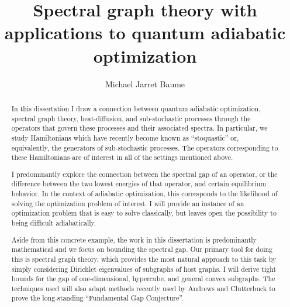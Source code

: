 \documentclass[letterpaper,12pt]{umd-thesis}
\title{Spectral graph theory with applications to quantum adiabatic optimization}
\author{Michael Jarret Baume}
\numberwithin{equation}{chapter}
\numberwithin{thm}{chapter}
\numberwithin{lem}{chapter}
\numberwithin{cor}{chapter}
\numberwithin{definition}{chapter}
\begin{document}
\begin{abstract}
    In this dissertation I draw a connection between quantum adiabatic optimization, spectral graph theory, heat-diffusion, and sub-stochastic processes through the operators that govern these processes and their associated spectra. In particular, we study Hamiltonians which have recently become known as ``stoquastic'' or, equivalently, the generators of sub-stochastic processes. The operators corresponding to these Hamiltonians are of interest in all of the settings mentioned above.
    
    I predominantly explore the connection between the spectral gap of an operator, or the difference between the two lowest energies of that operator, and certain equilibrium behavior. In the context of adiabatic optimization, this corresponds to the likelihood of solving the optimization problem of interest. I will provide an instance of an optimization problem that is easy to solve classically, but leaves open the possibility to being difficult adiabatically.

	Aside from this concrete example, the work in this dissertation is predominantly mathematical and we focus on bounding the spectral gap. Our primary tool for doing this is spectral graph theory, which provides the most natural approach to this task by simply considering Dirichlet eigenvalues of subgraphs of host graphs. I will derive tight bounds for the gap of one-dimensional, hypercube, and general convex subgraphs. The techniques used will also adapt methods recently used by Andrews and Clutterbuck to prove the long-standing ``Fundamental Gap Conjecture''.
\end{abstract} 
\end{document}
